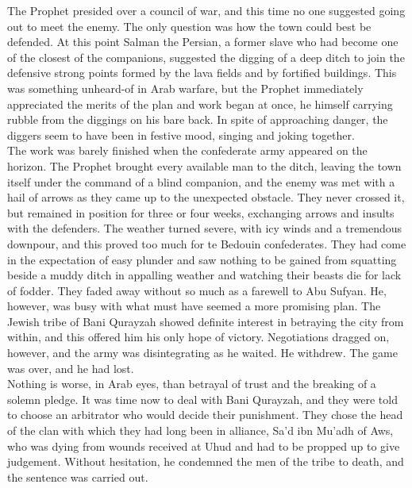\documentclass[10pt, twoside]{book}
\begin{document}
The Prophet presided over a council of war, and this time no one suggested going out to meet the 
enemy. The only question was how the town could best be defended. At this point Salman the Persian, a 
former slave who had become one of the closest of the companions, suggested the digging of a deep 
ditch to join the defensive strong points formed by the lava fields and by fortified buildings. This 
was something unheard\hyp{}of in Arab warfare, but the Prophet immediately appreciated the merits of the 
plan and work began at once, he himself carrying rubble from the diggings on his bare back. In spite 
of approaching danger, the diggers seem to have been in festive mood, singing and joking together. \\

The work was barely finished when the confederate army appeared on the horizon. The Prophet brought 
every available man to the ditch, leaving the town itself under the command of a blind companion, and 
the enemy was met with a hail of arrows as they came up to the unexpected obstacle. They never 
crossed it, but remained in position for three or four weeks, exchanging arrows and insults with the 
defenders. The weather turned severe, with icy winds and a tremendous downpour, and this proved too 
much for te Bedouin confederates. They had come in the expectation of easy plunder and saw nothing to 
be gained from squatting beside a muddy ditch in appalling weather and watching their beasts die for 
lack of fodder. They faded away without so much as a farewell to Abu Sufyan. He, however, was busy 
with what must have seemed a more promising plan. The Jewish tribe of Bani Qurayzah showed definite 
interest in betraying the city from within, and this offered him his only hope of victory. 
Negotiations dragged on, however, and the army was disintegrating as he waited. He withdrew. The game 
was over, and he had lost. \\

Nothing is worse, in Arab eyes, than betrayal of trust and the breaking of a solemn pledge. It was 
time now to deal with Bani Qurayzah, and they were told to choose an arbitrator who would decide 
their punishment. They chose the head of the clan with which they had long been in alliance, Sa'd ibn 
Mu'adh of Aws, who was dying from wounds received at Uhud and had to be propped up to give judgement. 
Without hesitation, he condemned the men of the tribe to death, and the sentence was carried out. \\
\end{document}

